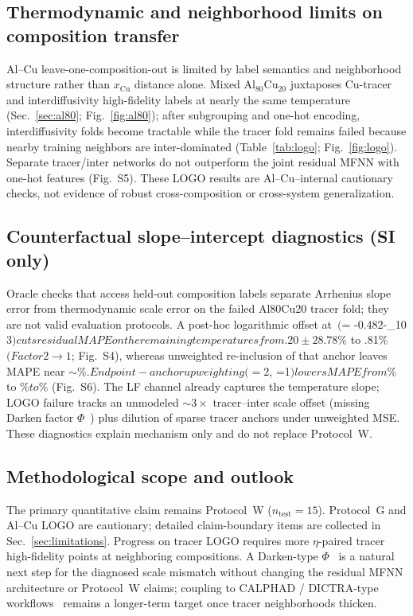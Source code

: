 \documentclass[review,12pt]{elsarticle}
\begin{document}
\subsection{Thermodynamic and neighborhood limits on composition transfer}

Al--Cu leave-one-composition-out is limited by label semantics and neighborhood structure rather than $x_{\mathrm{Cu}}$ distance alone. Mixed $\mathrm{Al}_{80}\mathrm{Cu}_{20}$ juxtaposes Cu-tracer and interdiffusivity high-fidelity labels at nearly the same temperature (Sec.~\ref{sec:al80}; Fig.~\ref{fig:al80}); after subgrouping and one-hot encoding, interdiffusivity folds become tractable while the tracer fold remains failed because nearby training neighbors are inter-dominated (Table~\ref{tab:logo}; Fig.~\ref{fig:logo}). Separate tracer/inter networks do not outperform the joint residual MFNN with one-hot features (Fig.~S5). These LOGO results are Al--Cu--internal cautionary checks, not evidence of robust cross-composition or cross-system generalization.

\subsection{Counterfactual slope--intercept diagnostics (SI only)}


Oracle checks that access held-out composition labels separate Arrhenius slope error from thermodynamic scale error on the failed Al80Cu20 tracer fold; they are not valid evaluation protocols. A post-hoc logarithmic offset at \,$ ($\delta = -0.482\approx -\log_{10} 3$) cuts residual MAPE on the remaining temperatures from .20\pm 28.78\%$ to .81\%$ (Factor2 \to 1$; Fig.~S4), whereas unweighted re-inclusion of that anchor leaves MAPE near $\sim\%. Endpoint-anchor upweighting ({=}2$, =1$) lowers MAPE from \%$ to \%$ to \%$ (Fig.~S6). The LF channel already captures the temperature slope; LOGO failure tracks an unmodeled $\sim 3\times$ tracer--inter scale offset (missing Darken factor $\Phi$~\cite{Darken1948}) plus dilution of sparse tracer anchors under unweighted MSE. These diagnostics explain mechanism only and do not replace Protocol~W.

\subsection{Methodological scope and outlook}

The primary quantitative claim remains Protocol~W ($n_{\mathrm{test}}=15$). Protocol~G and Al--Cu LOGO are cautionary; detailed claim-boundary items are collected in Sec.~\ref{sec:limitations}. Progress on tracer LOGO requires more $\eta$-paired tracer high-fidelity points at neighboring compositions. A Darken-type $\Phi$~\cite{Darken1948} is a natural next step for the diagnosed scale mismatch without changing the residual MFNN architecture or Protocol~W claims; coupling to CALPHAD / DICTRA-type workflows~\cite{andersson2002,tang2015} remains a longer-term target once tracer neighborhoods thicken.
\end{document}
